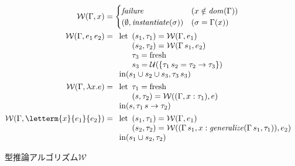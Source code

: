 \begin{figure}[htbp]
  \begin{align*}
    \mathcal W(\Gamma, x) &=
    \begin{cases}
      \mathit{failure} & (x \notin \mathit{dom}(\Gamma)) \\
      (\emptyset, \mathit{instantiate}(\sigma)) & (\sigma = \Gamma(x))
    \end{cases} \\
    \mathcal W(\Gamma, e_1 \, e_2) &=
    \begin{array}[t]{l}
      \mathrm{let}
        \begin{array}[t]{l}
          (s_1, \tau_1) = \mathcal W(\Gamma, e_1) \\
          (s_2, \tau_2) = \mathcal W(\Gamma \, s_1, e_2) \\
          \tau_3 = \mathrm{fresh} \\
          s_3 = \mathcal U(\{\tau_1 \, s_2 = \tau_2 \to \tau_3\})
        \end{array} \\
      \mathrm{in} (s_1 \cup s_2 \cup s_3, \tau_3 \, s_3)
    \end{array} \\
    \mathcal W(\Gamma, \lambda x. e) &=
    \begin{array}[t]{l}
      \mathrm{let}
        \begin{array}[t]{l}
          \tau_1 = \mathrm{fresh} \\
          (s, \tau_2) = \mathcal W((\Gamma, x : \tau_1), e) \\
        \end{array} \\
      \mathrm{in} (s, \tau_1 \, s \to \tau_2)
    \end{array} \\
    \mathcal W(\Gamma, \letterm{x}{e_1}{e_2}) &=
    \begin{array}[t]{l}
      \mathrm{let}
        \begin{array}[t]{l}
          (s_1, \tau_1) = \mathcal W(\Gamma, e_1) \\
          (s_2, \tau_2) =
            \mathcal W((\Gamma \, s_1, x : \mathit{generalize}(\Gamma \, s_1, \tau_1)), e_2) \\
        \end{array} \\
      \mathrm{in} (s_1 \cup s_2, \tau_2)
    \end{array}
  \end{align*}
  \caption{型推論アルゴリズム$\mathcal W$}
  \label{fig:algorithm-w}
\end{figure}

